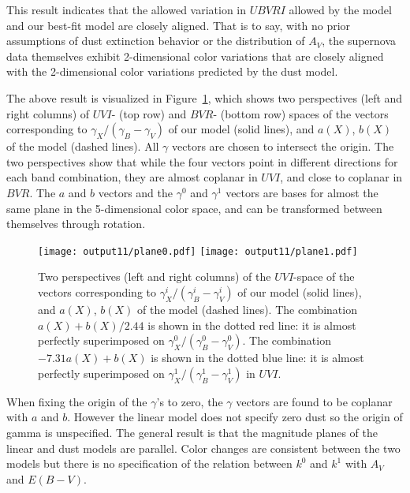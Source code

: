 \documentclass{aastex61}   	%
\begin{document}
This result indicates that
the allowed variation in $UBVRI$ allowed by the  model and our best-fit model are closely aligned.
That is to say, with no prior assumptions of dust extinction behavior or the distribution of $A_V$, the supernova data themselves exhibit
2-dimensional color variations that are closely aligned with the 2-dimensional color variations predicted by the  dust model.

The above result is visualized in Figure~\ref{plane:fig}, which  shows two perspectives (left and right columns) of $UVI$- (top row) and $BVR$- (bottom row) spaces
of the vectors corresponding to $\gamma_X/(\gamma_B-\gamma_V)$ of our model (solid lines),
and $a(X)$, $b(X)$ of the  model (dashed lines).  All $\gamma$ vectors are chosen to intersect the origin.
The two perspectives show that while the four vectors point in different directions for each band combination,
they are almost coplanar in $UVI$, and close to coplanar in $BVR$.  The $a$ and $b$ vectors and the $\gamma^0$ and $\gamma^1$
vectors are bases for almost the same plane in the 5-dimensional color space, and can be transformed between themselves through rotation.

\begin{figure}[htbp] %
   \centering
   \texttt{[image: output11/plane0.pdf]}
   \texttt{[image: output11/plane1.pdf]}
   \caption{
   \color{purple}
   Two perspectives (left and right columns) of the $UVI$-space
of the vectors corresponding to $\gamma^i_X/(\gamma^i_B-\gamma^i_V)$ of our model (solid lines),
   and $a(X)$, $b(X)$ of the  model (dashed lines).  The combination $a(X)+b(X)/2.44$ is shown in the dotted red
   line: it is almost perfectly superimposed on $\gamma^0_X/(\gamma^0_B-\gamma^0_V)$.   The combination $-7.31a(X)+b(X)$ is shown in the dotted blue
   line: it is
   almost  perfectly superimposed on $\gamma^1_X/(\gamma^1_B-\gamma^1_V)$ in $UVI$.  
   \label{plane:fig}}
\end{figure}


When fixing the origin of the $\gamma$'s to zero, the $\gamma$ vectors are found to be coplanar with $a$ and $b$.
However the linear model does not specify zero dust so the origin of gamma is unspecified.
The general result is that the magnitude planes of the linear and dust models are parallel.
Color changes are consistent between the two models but there is no specification of the relation between $k^0$ and $k^1$ with $A_V$ and $E(B-V)$. 
\end{document}
